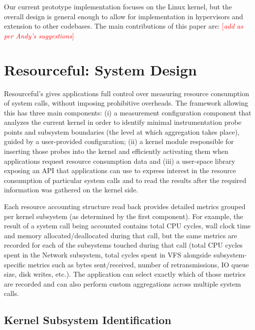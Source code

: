 \documentclass[letterpaper,twocolumn,10pt]{article}
\newcommand{\pname}{Resourceful}
\newcommand{\lnote}[1]{\textcolor{red}{[\textit{#1}]}} %
\begin{document}
Our current prototype implementation focuses on the Linux kernel, but the
overall design is general enough to allow for implementation in hypervisors and
extension to other codebases. The main contributions of this paper are:
\lnote{add as per Andy's suggestions}

\section{\pname: System Design} \pname's gives applications full control over
measuring resource consumption of system calls, without imposing prohibitive
overheads. The framework allowing this has three main components: (i) a
measurement configuration component that analyzes the current kernel in order to
identify minimal instrumentation probe points and subsystem boundaries (the
level at which aggregation takes place), guided by a user-provided
configuration; (ii) a kernel module responsible for inserting those probes into
the kernel and efficiently activating them when applications request resource
consumption data and (iii) a user-space library exposing an API that
applications can use to express interest in the resource consumption of
particular system calls and to read the results after the required information
was gathered on the kernel side.

Each resource accounting structure read back provides detailed metrics grouped
per kernel subsystem (as determined by the first component). For example, the
result of a system call being accounted contains total CPU cycles, wall clock
time and memory allocated/deallocated during that call, but the same metrics are
recorded for each of the subsystems touched during that call (total CPU cycles
spent in the Network subsystem, total cycles spent in VFS alongside
subsystem-specific metrics such as bytes sent/received, number of
retransmissions, IO queue size, disk writes, etc.). The application can select
exactly which of those metrics are recorded and can also perform custom
aggregations across multiple system calls.

\subsection{Kernel Subsystem Identification}
\end{document}
